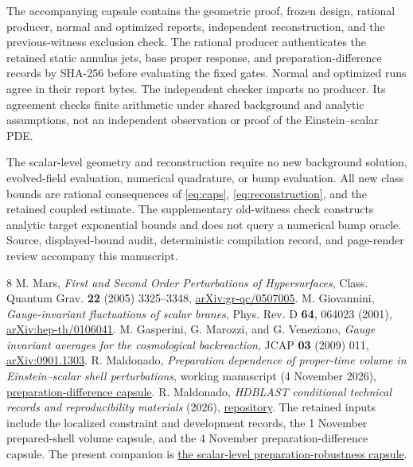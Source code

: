 \documentclass[11pt]{article}
\begin{document}
The accompanying capsule \cite{records} contains the geometric proof,
frozen design, rational producer, normal and optimized reports,
independent reconstruction, and the previous-witness exclusion check.
The rational producer authenticates the retained static annulus jets,
base proper response, and preparation-difference records by SHA-256
before evaluating the fixed gates. Normal and optimized runs agree in
their report bytes. The independent checker imports no producer.
Its agreement checks finite arithmetic under shared background and
analytic assumptions, not an independent observation or proof of the
Einstein--scalar PDE.

The scalar-level geometry and reconstruction require no new background
solution, evolved-field evaluation, numerical quadrature, or bump
evaluation. All new class bounds are rational consequences of
\eqref{eq:caps}, \eqref{eq:reconstruction}, and the retained coupled
estimate. The supplementary old-witness check constructs analytic target
exponential bounds and does not query a numerical bump oracle. Source,
displayed-bound audit, deterministic compilation record, and page-render
review accompany this manuscript.

\begin{thebibliography}{8}
\footnotesize
\setlength{\itemsep}{3pt}
 M. Mars, \emph{First and Second Order Perturbations of
Hypersurfaces}, Class. Quantum Grav. \textbf{22} (2005) 3325--3348,
\href{https://arxiv.org/abs/gr-qc/0507005}{arXiv:gr-qc/0507005}.
 M. Giovannini, \emph{Gauge-invariant fluctuations
of scalar branes}, Phys. Rev. D \textbf{64}, 064023 (2001),
\href{https://arxiv.org/abs/hep-th/0106041}{arXiv:hep-th/0106041}.
 M. Gasperini, G. Marozzi, and G. Veneziano,
\emph{Gauge invariant averages for the cosmological backreaction},
JCAP \textbf{03} (2009) 011,
\href{https://arxiv.org/abs/0901.1303}{arXiv:0901.1303}.
 R. Maldonado, \emph{Preparation dependence of
proper-time volume in Einstein--scalar shell perturbations}, working
manuscript (4 November 2026),
\href{https://github.com/maldonado-research/HDblast/tree/main/research/HDBLAST_SHELL_PREPARATION_DEPENDENCE_20261104}{preparation-difference capsule}.
 R. Maldonado, \emph{HDBLAST conditional technical
records and reproducibility materials} (2026),
\href{https://github.com/maldonado-research/HDblast}{repository}.
The retained inputs include the localized constraint and development
records, the 1 November prepared-shell volume capsule, and the
4 November preparation-difference capsule. The present companion is
\href{https://github.com/maldonado-research/HDblast/tree/main/research/HDBLAST_INTRINSIC_PREPARATION_ROBUSTNESS_20261104}{the scalar-level preparation-robustness capsule}.
\end{thebibliography}
\end{document}

